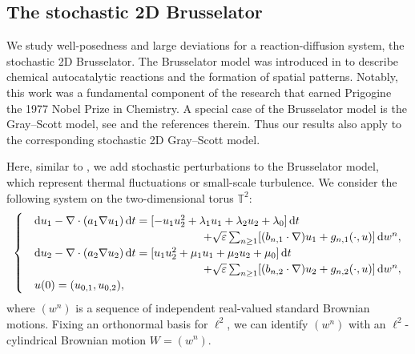 \documentclass{amsart}
\newcommand{\dd}{\,\mathrm{d}}
\newcommand{\ddd}{\mathrm{d}}
\newcommand{\<}{\langle}
\newcommand{\?}{\rangle}
\newcommand{\Tor}{\mathbb{T}}
\renewcommand{\Tor}{\mathbb{T}^2}
\theoremstyle{plain}
\theoremstyle{remark}
\theoremstyle{plain}
\numberwithin{equation}{section}
\newcommand{\eps}{\varepsilon}
\begin{document}
\subsection{The stochastic 2D Brusselator}\label{ss:brusselator}

We study well-posedness and large deviations for a reaction-diffusion system, the stochastic 2D Brusselator. The Brusselator model was introduced in \cite{prigogine68,prigogine71} to describe chemical autocatalytic reactions and the formation of spatial patterns.  
Notably, this work was a fundamental component of the research that earned Prigogine the 1977 Nobel Prize in Chemistry. 
A special case of the Brusselator model is the Gray--Scott model, see \cite[Ex.\ 4.12]{AVreac24} and the references therein. Thus our results also apply to the corresponding stochastic 2D Gray--Scott model.


Here, similar to \cite[\S 4.3]{AVreac24}, we add stochastic perturbations to the Brusselator model, which represent thermal fluctuations or small-scale turbulence. 
We consider the following system on the two-dimensional torus $\Tor$: 
\begin{equation}\label{eq:brusselator}
     \begin{cases}
   &\ddd u_1-\nabla\cdot(a_1 \nabla u_1)\dd t=[ -u_1u_2^2 +\lambda_1u_1+\lambda_2u_2+\lambda_0]\dd t\\
   &\hspace{5.3cm}+\sqrt{\eps}\sum_{n\geq 1}[(b_{n,1}\cdot\nabla)u_1+g_{n,1}(\cdot,u)]\dd w^n,   \\
   &\ddd u_2-\nabla\cdot(a_2 \nabla u_2)\dd t=  [u_1u_2^2 +\mu_1u_1+\mu_2u_2+\mu_0]\dd t\\
   &\hspace{5.3cm}+\sqrt{\eps}\sum_{n\geq 1}[(b_{n,2}\cdot\nabla)u_2+g_{n,2}(\cdot,u)]\dd w^n,   \\
   &u(0)=(u_{0,1},u_{0,2}),
\end{cases}
\end{equation}
where $(w^n)$ is a sequence of independent real-valued standard Brownian motions. Fixing an orthonormal basis for $\ell^2$, we can identify $(w^n)$ with an $\ell^2$-cylindrical Brownian motion $W=(w^n)$. 

 
\end{document}
